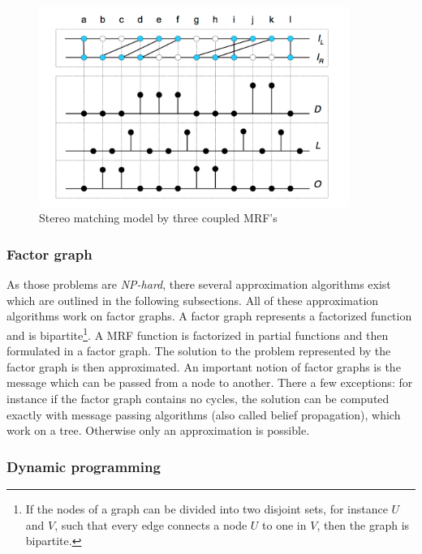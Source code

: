 \begin{figure}[h!]
  \centering
  \includegraphics[width=0.9\textwidth]{src/images/mrf-stereo-matching.png}
  \caption[Stereo matching model by three coupled MRF's]{Stereo matching model by three coupled MRF's\citep{sun2003stereo}}
  \label{fig:mrf-stereo-matching}
\end{figure}

\subsubsection{Factor graph}

\noindent As those problems are \textit{NP-hard}, there several approximation algorithms exist which are outlined in the following subsections.
All of these approximation algorithms work on factor graphs.
A factor graph represents a factorized function and is bipartite\footnote{If the nodes of a graph can be divided into two disjoint sets, for instance $U$ and $V$, such that every edge connects a node $U$ to one in $V$, then the graph is bipartite.}.
A MRF function is factorized in partial functions and then formulated in a factor graph.
The solution to the problem represented by the factor graph is then approximated.
An important notion of factor graphs is the message which can be passed from a node to another.
There a few exceptions: for instance if the factor graph contains no cycles, the solution can be computed exactly with message passing algorithms (also called belief propagation), which work on a tree.
Otherwise only an approximation is possible.

\subsubsection{Dynamic programming}

